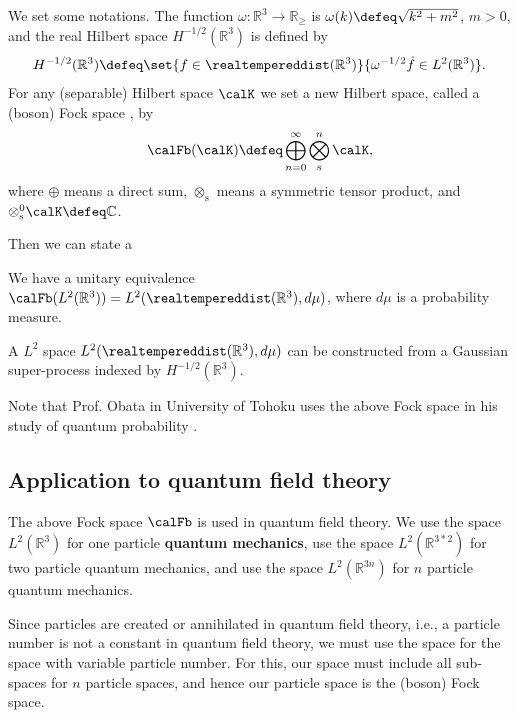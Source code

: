 \documentclass[openany, a4paper, oneside]{jsbook}
\begin{document}
We set some notations.
The function $\omega \colon \mathbb{R}^3 \to \mathbb{R}_{\geq}$ is $\omega (k) \defeq \sqrt{k^2 + m^2}$, $m > 0$,
and the real Hilbert space $H^{-1/2} (\mathbb{R}^3)$ is defined by
\begin{align}
 H^{-1/2} (\mathbb{R}^3)
 \defeq
 \set{f \in \realtempereddist (\mathbb{R}^3)}{\omega^{-1/2} \hat{f} \in L^2 (\mathbb{R}^3)}.
\end{align}
For any (separable) Hilbert space $\calK$ we set a new Hilbert space, called a (boson) Fock space \cite{AsaoArai1, AsaoArai2}, by
\begin{align}
 \calFb (\calK)
 \defeq
 \bigoplus_{n=0}^{\infty} \bigotimes_{\mathrm{s}}^n \calK,
\end{align}
where $\oplus$ means a direct sum, $\otimes_{\mathrm{s}}$ means a symmetric tensor product,
and  $\otimes_{\mathrm{s}}^0 \calK \defeq \mathbb{C}$.

Then we can state a
\begin{thm}
 We have a unitary equivalence $\calFb (L^2 (\mathbb{R}^3)) = L^2 (\realtempereddist (\mathbb{R}^3), d \mu)$,
 where $d \mu$ is a probability measure.
\end{thm}
\begin{thm}
 A $L^2$ space $L^2 (\realtempereddist (\mathbb{R}^3), d \mu)$ can be constructed from a Gaussian super-process indexed by $H^{-1/2} (\mathbb{R}^3)$.
\end{thm}

Note that Prof. Obata in University of Tohoku uses the above Fock space in his study of quantum probability \cite{AccardiObata1}.
\subsection{Application to quantum field theory \cite{AsaoArai1, AsaoArai2}}

The above Fock space $\calFb$ is used in quantum field theory.
We use the space $L^2 (\mathbb{R}^3)$ for one particle \textbf{quantum mechanics},
use the space $L^2 (\mathbb{R}^{3*2})$ for two particle quantum mechanics,
and use the space $L^2 (\mathbb{R}^{3n})$ for $n$ particle quantum mechanics.

Since particles are created or annihilated in quantum field theory, i.e.,
a particle number is not a constant in quantum field theory,
we must use the space for the space with variable particle number.
For this, our space must include all sub-spaces for $n$ particle spaces,
and hence our particle space is the (boson) Fock space.
\end{document}
